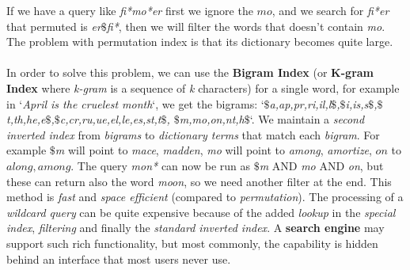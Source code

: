 \documentclass{article}
\begin{document}
If we have a query like \emph{fi*mo*er} first we ignore the $mo$, and we search for \emph{fi*er} that permuted is \emph{er$\$$fi*}, then we will filter the words that doesn't contain \emph{mo}. The problem with permutation index is that its dictionary becomes quite large.\\\\
In order to solve this problem, we can use the \textbf{Bigram Index} (or\textbf{ K-gram Index} where \emph{k-gram} is a sequence of \emph{k} characters) for a single word, for example in `\emph{April is the cruelest month}`, we get the bigrams: `\emph{$\$$a,ap,pr,ri,il,l$\$$,$\$$i,is,s$\$$,$\$$t,th,he,e$\$$,$\$$c,cr,ru,ue,el,le,es,st,t$\$$, $\$$m,mo,on,nt,h$\$$}`. We maintain a \emph{second inverted index} from \emph{bigrams} to \emph{dictionary terms} that match each \emph{bigram}. For example \emph{$\$$m} will point to \emph{mace}, \emph{madden}, \emph{mo} will point to \emph{among}, \emph{amortize}, $on$ to $along, among$. The query \emph{mon*} can now be run as \emph{$\$$m} AND \emph{mo} AND \emph{on}, but these can return also the word \emph{moon}, so we need another filter at the end. This method is \emph{fast} and \emph{space efficient} (compared to \emph{permutation}). The processing of a \emph{wildcard query} can be quite expensive because of the added \emph{lookup} in the \emph{special index}, \emph{filtering} and finally the \emph{standard inverted index}. A \textbf{search engine} may support such rich functionality, but most commonly, the capability is hidden behind an interface that most users never use.
\end{document}
